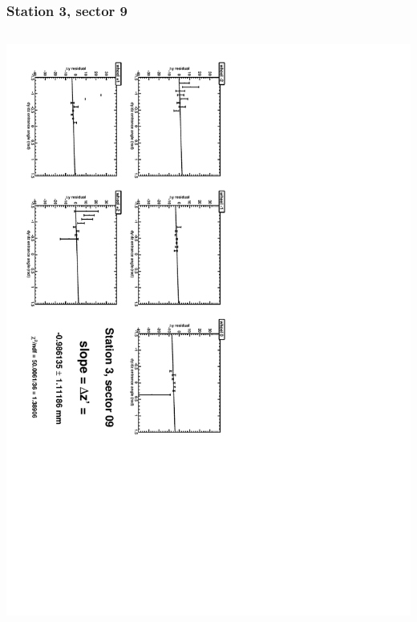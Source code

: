 \documentclass[compress]{beamer}
\begin{document}
\begin{frame}
\frametitle{Station 3, sector 9}
\begin{columns}
\includegraphics[height=\linewidth, angle=90]{zfits/zfit_3_09.pdf}


\end{columns}
\end{frame}
\end{document}

